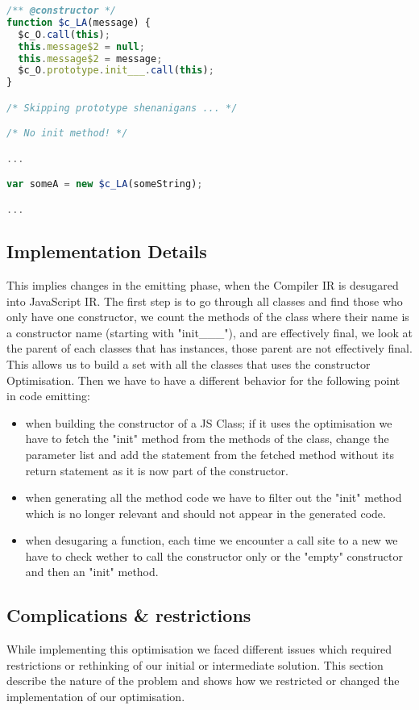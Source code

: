 \begin{lstlisting}[language=javascript,caption=Generated JavaScript with constructor optimisation., label={lst:ctorOptJS}]
/** @constructor */
function $c_LA(message) {
  $c_O.call(this);
  this.message$2 = null;
  this.message$2 = message;
  $c_O.prototype.init___.call(this);
}

/* Skipping prototype shenanigans ... */

/* No init method! */

...

var someA = new $c_LA(someString);

...

\end{lstlisting}

\subsection{Implementation Details}
This implies changes in the emitting phase, when the Compiler IR is desugared into JavaScript IR. The first step is to go through all classes and find those who only have one constructor, we count the methods of the class where their name is a constructor name (starting with "init\_\_\_"), and are effectively final, we look at the parent of each classes that has instances, those parent are not effectively final. This allows us to build a set with all the classes that uses the constructor Optimisation. Then we have to have a different behavior for the following point in code emitting:
\begin{itemize}
    \item when building the constructor of a JS Class; if it uses the optimisation we have to fetch the "init" method from the methods of the class, change the parameter list and add the statement from the fetched method without its return statement as it is now part of the constructor.
    \item when generating all the method code we have to filter out the "init" method which is no longer relevant and should not appear in the generated code.
    \item when desugaring a function, each time we encounter a call site to a new we have to check wether to call the constructor only or the "empty" constructor and then an "init" method.
\end{itemize}

\subsection{Complications \& restrictions}
While implementing this optimisation we faced different issues which required restrictions or rethinking of our initial or intermediate solution. This section describe the nature of the problem and shows how we restricted or changed the implementation of our optimisation.
